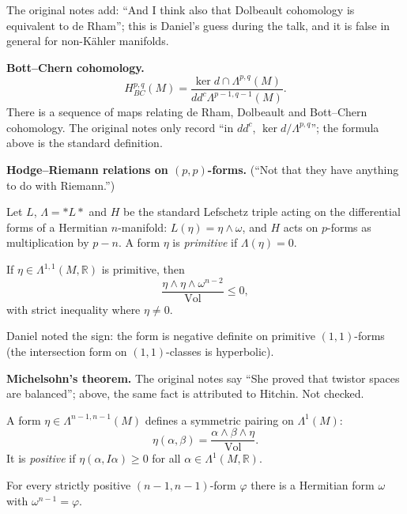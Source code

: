 The original notes add: ``And I think also
that Dolbeault cohomology is equivalent to
de Rham''; this is Daniel's guess during the
talk, and it is false in general for
non-Kähler manifolds.

\medskip\noindent
{\bf Bott--Chern cohomology.}
$$
H^{p,q}_{BC}(M)=
\frac{\ker d\cap\Lambda^{p,q}(M)}
{dd^c\Lambda^{p-1,q-1}(M)}.
$$
There is a sequence of maps relating de
Rham, Dolbeault and Bott--Chern cohomology.
The original notes only record ``in $dd^c$,
$\ker d/\Lambda^{p,q}$''; the formula above
is the standard definition.

\medskip\noindent
{\bf Hodge--Riemann relations on
$(p,p)$-forms.} (``Not that they have
anything to do with Riemann.'')

\begin{definition}
\label{definition-verbitsky-primitive}
Let $L$, $\Lambda=*L*$ and $H$ be the
standard Lefschetz triple acting on the
differential forms of a Hermitian
$n$-manifold: $L(\eta)=\eta\wedge\omega$,
and $H$ acts on $p$-forms as multiplication
by $p-n$. A form $\eta$ is \emph{primitive}
if $\Lambda(\eta)=0$.
\end{definition}

\begin{proposition}
\label{proposition-verbitsky-hodge-riemann}
If $\eta\in\Lambda^{1,1}(M,\mathbb{R})$ is
primitive, then
$$
\frac{\eta\wedge\eta\wedge\omega^{n-2}}
{\operatorname{Vol}}\leq 0,
$$
with strict inequality where $\eta\neq 0$.
\end{proposition}

Daniel noted the sign: the form is negative
definite on primitive $(1,1)$-forms (the
intersection form on $(1,1)$-classes is
hyperbolic).

\medskip\noindent
{\bf Michelsohn's theorem.} The original
notes say ``She proved that twistor spaces
are balanced''; above, the same fact is
attributed to Hitchin. Not checked.

A form $\eta\in\Lambda^{n-1,n-1}(M)$ defines
a symmetric pairing on $\Lambda^1(M)$:
$$
\eta(\alpha,\beta)=
\frac{\alpha\wedge\beta\wedge\eta}
{\operatorname{Vol}}.
$$
It is \emph{positive} if
$\eta(\alpha,I\alpha)\geq 0$ for all
$\alpha\in\Lambda^1(M,\mathbb{R})$.

\begin{theorem}[Michelsohn]
\label{theorem-verbitsky-michelsohn}
For every strictly positive
$(n-1,n-1)$-form $\varphi$ there is a
Hermitian form $\omega$ with
$\omega^{n-1}=\varphi$.
\end{theorem}

